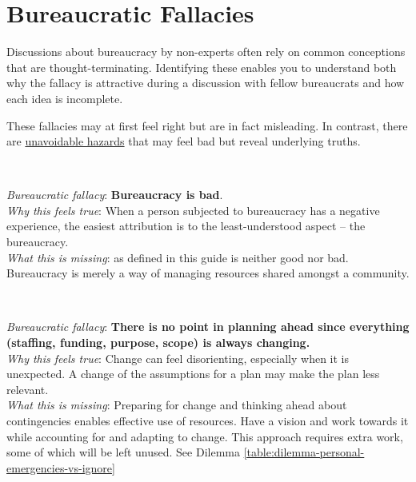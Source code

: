 \section{Bureaucratic Fallacies\label{sec:fallacies}}

Discussions about bureaucracy by non-experts often rely on common conceptions that are \gls{thought-terminating}. Identifying these enables you to understand both why the fallacy is attractive during a discussion with fellow bureaucrats and how each idea is incomplete.

These fallacies may at first feel right but are in fact misleading. In contrast, there are  
\hyperref[sec:unavoidable-hazards]{unavoidable hazards} \iftoggle{haspagenumbers}{(see page~\pageref{sec:unavoidable-hazards})}{} that may feel bad but reveal underlying truths.

\ \\
\begin{samepage}
\textit{Bureaucratic fallacy}: \textbf{Bureaucracy is bad}. \\
\textit{Why this feels true}: When a person subjected to bureaucracy has a negative experience, the easiest attribution is to the least-understood aspect -- the bureaucracy.\\
\textit{What this is missing}: 
\iftoggle{glossarysubstitutionworks}{\Gls{bureaucracy}}{Bureaucracy}
 as defined in this guide is neither good nor bad. Bureaucracy is merely a way of managing  resources shared amongst a community. 
 \end{samepage}

\ \\
\begin{samepage}
\textit{Bureaucratic fallacy}: 
\textbf{There is no point in planning ahead since everything (staffing, funding, purpose, scope) is always changing.}\\
\textit{Why this feels true}: Change can feel disorienting, especially when it is unexpected. A change of the assumptions for a plan may make the plan less relevant. \\
\textit{What this is missing}: Preparing for change and thinking ahead about contingencies enables effective use of resources. Have a vision and work towards it while accounting for and adapting to change. This approach requires extra work, some of which will be left unused. See Dilemma \ref{table:dilemma-personal-emergencies-vs-ignore}\iftoggle{haspagenumbers}{ on page~\pageref{table:dilemma-personal-emergencies-vs-ignore}.}{.}
\end{samepage}

